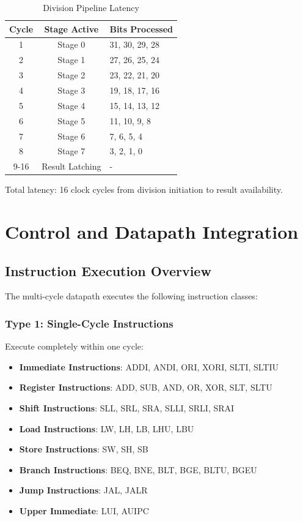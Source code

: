 \documentclass[a4paper, 11pt]{article}
\begin{document}
\begin{table}[H]
\centering
\caption{Division Pipeline Latency}
\begin{tabular}{|c|c|l|}
\hline
\textbf{Cycle} & \textbf{Stage Active} & \textbf{Bits Processed} \\
\hline
1 & Stage 0 & 31, 30, 29, 28 \\
\hline
2 & Stage 1 & 27, 26, 25, 24 \\
\hline
3 & Stage 2 & 23, 22, 21, 20 \\
\hline
4 & Stage 3 & 19, 18, 17, 16 \\
\hline
5 & Stage 4 & 15, 14, 13, 12 \\
\hline
6 & Stage 5 & 11, 10, 9, 8 \\
\hline
7 & Stage 6 & 7, 6, 5, 4 \\
\hline
8 & Stage 7 & 3, 2, 1, 0 \\
\hline
9-16 & Result Latching & - \\
\hline
\end{tabular}

Total latency: 16 clock cycles from division initiation to result availability.
\end{table}

\newpage

\section{Control and Datapath Integration}

\subsection{Instruction Execution Overview}

The multi-cycle datapath executes the following instruction classes:

\subsubsection{Type 1: Single-Cycle Instructions}
Execute completely within one cycle:
\begin{itemize}
    \item \textbf{Immediate Instructions}: ADDI, ANDI, ORI, XORI, SLTI, SLTIU
    \item \textbf{Register Instructions}: ADD, SUB, AND, OR, XOR, SLT, SLTU
    \item \textbf{Shift Instructions}: SLL, SRL, SRA, SLLI, SRLI, SRAI
    \item \textbf{Load Instructions}: LW, LH, LB, LHU, LBU
    \item \textbf{Store Instructions}: SW, SH, SB
    \item \textbf{Branch Instructions}: BEQ, BNE, BLT, BGE, BLTU, BGEU
    \item \textbf{Jump Instructions}: JAL, JALR
    \item \textbf{Upper Immediate}: LUI, AUIPC
\end{itemize}
\end{document}
